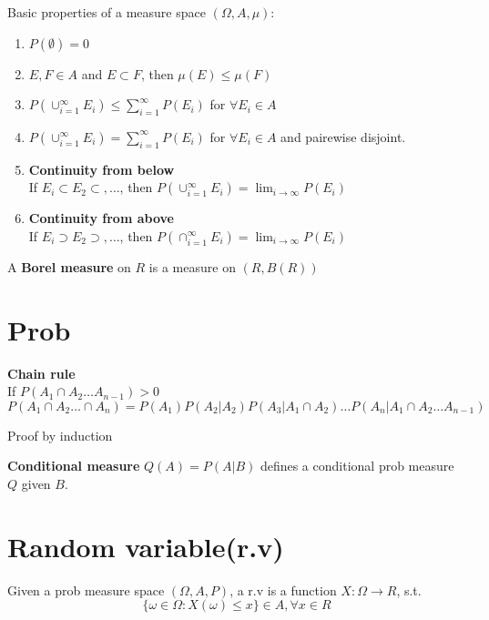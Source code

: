 \documentclass{article}
\begin{document}
Basic properties of a measure space $(\Omega, A, \mu)$:
\begin{enumerate}
\item $P(\emptyset) = 0$
\item $E,F \in A$ and $E \subset F$, then $\mu(E) \leq \mu(F)$
\item $P(\cup_{i=1}^{\infty} E_i) \leq \sum_{i=1}^{\infty}P(E_i)$ for $\forall E_i \in A$
\item $P(\cup_{i=1}^{\infty} E_i) = \sum_{i=1}^{\infty}P(E_i)$ for $\forall E_i \in A$ and pairewise disjoint.
\item \textbf{Continuity from below}\\
If $E_i \subset E_2 \subset,\ldots $, then $P(\cup_{i=1}^{\infty} E_i) = \lim_{i \to \infty} P(E_i)$
\item \textbf{Continuity from above}\\
If $E_i \supset E_2 \supset,\ldots $, then $P(\cap_{i=1}^{\infty} E_i) = \lim_{i \to \infty} P(E_i)$
\end{enumerate}

\begin{definition}
A \textbf{Borel measure} on $R$ is a measure on $(R, B(R))$
\end{definition}

\section{Prob}
\begin{theorem}
\textbf{Chain rule}\\
If $P(A_1 \cap A_2 \ldots A_{n-1}) > 0$
$$ P(A_1 \cap A_2 \ldots \cap A_n) = P(A_1) P(A_2 | A_2) P(A_3 | A_1 \cap A_2) \ldots P(A_n | A_1 \cap A_2 \ldots A_{n-1}) $$
\end{theorem}
Proof by induction

\begin{definition}
\textbf{Conditional measure} $Q(A) = P(A|B)$ defines a conditional prob measure $Q$ given $B$.
\end{definition}

\section{Random variable(r.v)}
\begin{definition}
Given a prob measure space $(\Omega, A, P)$, a r.v is a function $X: \Omega \rightarrow R$, s.t.
$$\{\omega \in \Omega: X(\omega) \leq x\} \in A, \forall x \in R$$
\end{definition}
\end{document}
